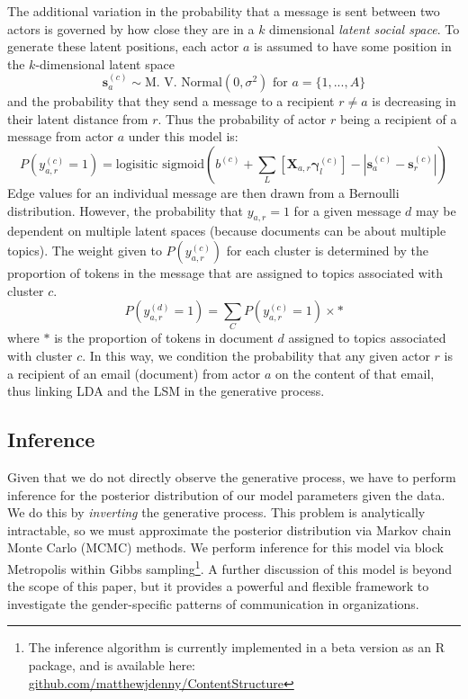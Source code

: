 \documentclass{pnastwo}
\begin{document}
\begin{article}
The additional variation in the probability that a message is sent between two actors is governed by how close they are in a $k$ dimensional \emph{latent social space}. To generate these latent positions, each actor $a$ is assumed to have some position in the $k$-dimensional latent space
\begin{equation}
	\mathbf{s}_a^{(c)} \sim \text{M. V. Normal}(0, \sigma^2) \text{ for } a = \{1, ...,A\}
\end{equation}
and the probability that they send a message to a recipient $r \neq a$ is decreasing in their latent distance from $r$. Thus the probability of actor $r$ being a recipient of a message from actor $a$ under this model is:
\begin{equation}
	P(y_{a,r}^{(c)} = 1) = \text{logisitic sigmoid}\left( b^{(c)} + \sum_L \left[\mathbf{X}_{a,r} \mathbf{\gamma}_l^{(c)}\right] - |\mathbf{s}_a^{(c)} - \mathbf{s}_r^{(c)}| \right)
\end{equation}
Edge values for an individual message are then drawn from a Bernoulli distribution. However, the probability that $y_{a,r} = 1$ for a given message $d$ may be dependent on multiple latent spaces (because documents can be about multiple topics). The weight given to $P(y_{a,r}^{(c)})$ for each cluster is determined by the proportion of tokens in the message that are assigned to topics associated with cluster $c$.  
\begin{equation}
	P(y_{a,r}^{(d)} = 1) = \sum_C P(y_{a,r}^{(c)} = 1) \times *
\end{equation}
where $*$ is the proportion of tokens in document $d$ assigned to topics associated with cluster $c$. In this way, we condition the probability that any given actor $r$ is a recipient of an email (document) from actor $a$ on the content of that email, thus linking LDA and the LSM in the generative process.

\subsection{Inference}
Given that we do not directly observe the generative process, we have to perform inference for the posterior distribution of our model parameters given the data. We do this by \emph{inverting} the generative process. This problem is analytically intractable, so we must approximate the posterior distribution via Markov chain Monte Carlo (MCMC) methods. We perform inference for this model via block Metropolis within Gibbs sampling\footnote{The inference algorithm is currently implemented in a beta version as an R package, and is available here: \href{https://github.com/matthewjdenny/ContentStructure}{github.com/matthewjdenny/ContentStructure}}. A further discussion of this model is beyond the scope of this paper, but it provides a powerful and flexible framework to investigate the gender-specific patterns of communication in organizations.


\end{article}
\end{document}
